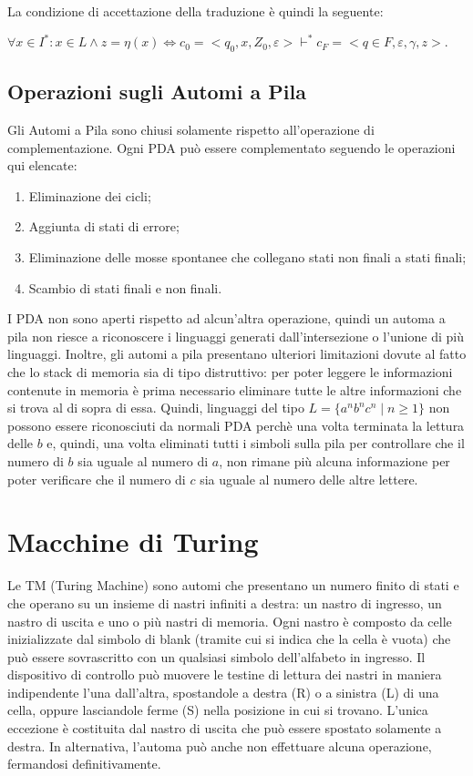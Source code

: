   La condizione di accettazione della traduzione è quindi la seguente:

  \begin{math}
    \forall x \in I^* : x \in L \wedge z = \eta(x) \iff c_0 = <q_0, x, Z_0, \varepsilon> \vdash ^* c_F=<q\in F, \varepsilon, \gamma, z>.
  \end{math}

  \subsection{Operazioni sugli Automi a Pila}
  Gli Automi a Pila sono chiusi solamente rispetto all'operazione di complementazione. Ogni PDA può essere complementato seguendo le operazioni qui elencate:
  \begin{enumerate}
    \item Eliminazione dei cicli;
    \item Aggiunta di stati di errore;
    \item Eliminazione delle mosse spontanee che collegano stati non finali a stati finali;
    \item Scambio di stati finali e non finali.
  \end{enumerate}

  \noindent
  I PDA non sono aperti rispetto ad alcun'altra operazione, quindi un automa a pila non riesce a riconoscere i linguaggi generati dall'intersezione o l'unione di più linguaggi. Inoltre, gli automi a pila presentano ulteriori limitazioni dovute al fatto che lo stack di memoria sia di tipo distruttivo: per poter leggere le informazioni contenute in memoria è prima necessario eliminare tutte le altre informazioni che si trova al di sopra di essa. Quindi, linguaggi del tipo \(L=\{a^nb^nc^n\;|\;n\geq 1\}\) non possono essere riconosciuti da normali PDA perchè una volta terminata la lettura delle \(b\) e, quindi, una volta eliminati tutti i simboli sulla pila per controllare che il numero di \(b\) sia uguale al numero di \(a\), non rimane più alcuna informazione per poter verificare che il numero di \(c\) sia uguale al numero delle altre lettere.

  \section{Macchine di Turing}  
  Le TM (Turing Machine) sono automi che presentano un numero finito di stati  e che operano su un insieme di nastri infiniti a destra: un nastro di ingresso, un nastro di uscita e uno o più nastri di memoria. Ogni nastro è composto da celle inizializzate dal simbolo di blank (tramite cui si indica che la cella è vuota) che può essere sovrascritto con un qualsiasi simbolo dell'alfabeto in ingresso. Il dispositivo di controllo può muovere le testine di lettura dei nastri in maniera indipendente l'una dall'altra, spostandole a destra (R) o a sinistra (L) di una cella, oppure lasciandole ferme (S) nella posizione in cui si trovano. L'unica eccezione è costituita dal nastro di uscita che può essere spostato solamente a destra. In alternativa, l'automa può anche non effettuare alcuna operazione, fermandosi definitivamente. 
  
